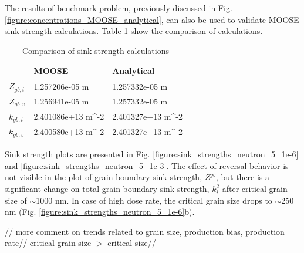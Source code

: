 \documentclass[a4paper]{article}
\begin{document}
  The results of benchmark problem, previously discussed in Fig. \ref{figure:concentrations_MOOSE_analytical}, can also be used to validate MOOSE sink strength calculations. Table \ref{table:sink_strengths_calculations} show the comparison of calculations.
    \begin{table}[h!]
      \centering
      \caption{Comparison of sink strength calculations}
      \label{table:sink_strengths_calculations}
      \begin{tabular}{ ||p{2cm}|p{3cm}|p{3cm}||  }
         \hline
          & MOOSE & Analytical\\
         \hline\hline\hline
         ${Z_{gb,i}}$  & 1.257206e-05 m & 1.257332e-05 m\\
         ${Z_{gb,v}}$  & 1.256941e-05 m & 1.257332e-05 m\\
         ${k_{gb,i}}$  & 2.401086e+13 m^{-2} & 2.401327e+13 m^{-2}\\
         ${k_{gb,v}}$  & 2.400580e+13 m^{-2} & 2.401327e+13 m^{-2}\\
         \hline
      \end{tabular}
    \end{table}
    \newpage
    Sink strength plots are presented in Fig. \ref{figure:sink_strengths_neutron_5_1e-6} and \ref{figure:sink_strengths_neutron_5_1e-3}. The effect of reversal behavior is not visible in the plot of grain boundary sink strength, ${Z^{gb}}$, but there is a significant change on total grain boundary sink strength, ${k^2_i}$ after critical grain size of ${\sim}$1000 nm. In case of high dose rate, the critical grain size drops to ${\sim}$250 nm (Fig. \ref{figure:sink_strengths_neutron_5_1e-6}b).

    //
    more comment on trends related to grain size, production bias, production rate//
    critical grain size $>$ critical size//
\end{document}
